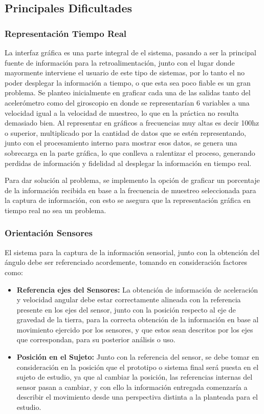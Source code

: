 \documentclass[12pt,a4paper]{article}
\begin{document}
\subsection{Principales Dificultades}
\subsubsection{Representación Tiempo Real}
	La interfaz gráfica es una parte integral de el sistema, pasando a ser la principal fuente de información para la retroalimentación, junto con el lugar donde mayormente interviene el usuario de este tipo de sistemas, por lo tanto el no poder desplegar la información a tiempo, o que esta sea poco fiable es un gran problema. Se planteo inicialmente en graficar cada una de las salidas tanto del acelerómetro como del giroscopio en donde se representarían 6 variables a una velocidad igual a la velocidad de muestreo, lo que en la práctica no resulta demasiado bien. Al representar en gráficos a frecuencias muy altas es decir 100hz o superior, multiplicado por la cantidad de datos que se estén representando, junto con el procesamiento interno para mostrar esos datos, se genera una sobrecarga en la parte gráfica, lo que conlleva a ralentizar el proceso, generando perdidas de información y fidelidad al desplegar la información en tiempo real.

Para dar solución al problema, se implemento la opción de graficar un porcentaje de la información recibida en base a la frecuencia de muestreo seleccionada para la captura de información, con esto se asegura que la representación gráfica en tiempo real no sea un problema.

\subsubsection{Orientación Sensores}
El sistema para la captura de la información sensorial, junto con la obtención del ángulo debe ser referenciado acordemente, tomando en consideración factores como:
\begin{itemize}

\item \textbf{Referencia ejes del Sensores:} La obtención de información de aceleración y velocidad angular debe estar correctamente alineada con la referencia presente en los ejes del sensor, junto con la posición respecto al eje de gravedad de la tierra, para la correcta obtención de la información en base al movimiento ejercido por los sensores, y que estos sean descritos por los ejes que correspondan, para su posterior análisis o uso.
    
\item \textbf{Posición en el Sujeto:} Junto con la referencia del sensor, se debe tomar en consideración en la posición que el prototipo o sistema final será puesta en el sujeto de estudio, ya que al cambiar la posición, las referencias internas del sensor pasan a cambiar, y con ello la información entregada comenzaría a describir el movimiento desde una perspectiva distinta a la planteada para el estudio.
\end{itemize}
\end{document}
